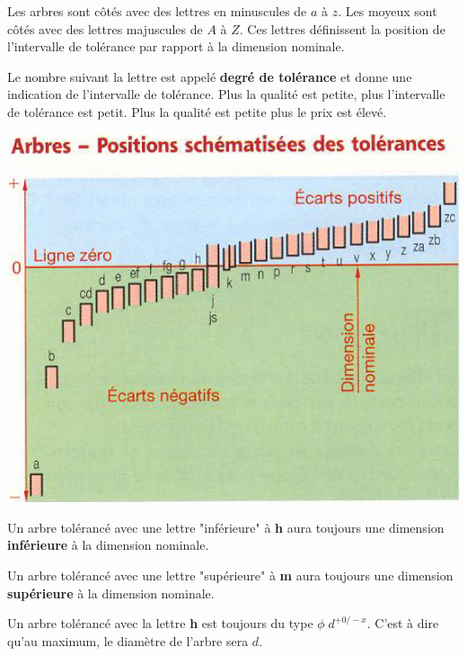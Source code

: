 \documentclass[11pt,oneside]{article}
\begin{document}
\begin{resultat}
Les arbres sont côtés avec des lettres en minuscules de $a$ à $z$. 
Les moyeux sont côtés avec des lettres majuscules de $A$ à $Z$. 
Ces lettres définissent la position de l'intervalle de tolérance par rapport à la dimension nominale.

\vspace{1cm}

Le nombre suivant la lettre est appelé \textbf{degré de tolérance} et donne une indication de l'intervalle de tolérance. Plus la qualité est petite, plus l'intervalle de tolérance est petit. Plus la qualité est petite plus le prix est élevé.
\end{resultat}

\begin{minipage}[c]{.45\linewidth}
\begin{center}
\includegraphics[width=.9\textwidth]{png/arbre}
\end{center}

Un arbre tolérancé avec une lettre "inférieure" à \textbf{h} aura toujours une dimension \textbf{inférieure} à la dimension nominale.

Un arbre tolérancé avec une lettre "supérieure" à \textbf{m} aura toujours une dimension \textbf{supérieure} à la dimension nominale.

Un arbre tolérancé avec la lettre \textbf{h} est toujours du type $\phi\; d ^{+0 / -x}$. C'est à dire qu'au maximum, le diamètre de l'arbre sera $d$.

\end{minipage}\hfill
\end{document}
